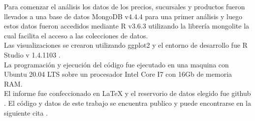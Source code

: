 Para comenzar el análisis los datos de los precios, sucursales y productos fueron llevados a una base de datos MongoDB v4.4.4\cite{mongodb} para una primer análisis y luego estos datos fueron accedidos mediante R v3.6.3 \cite{R} utilizando la librería mongolite \cite{mongolite} la cual facilita el acceso a las colecciones de datos.\\
Las visualizaciones se crearon utilizando ggplot2 \cite{ggplot2} y el entorno de desarrollo fue R Studio v 1.4.1103 \cite{rstudio}.\\
La programación y ejecución del código fue ejecutado en una maquina con Ubuntu 20.04 LTS sobre un procesador Intel Core I7 con 16Gb de memoria RAM.\\
El informe fue confeccionado en LaTeX \cite{latex} y el reservorio de datos elegido fue github \cite{github}.
El código y datos de este trabajo se encuentra publico y puede encontrarse en la siguiente cita \cite{repo}.
